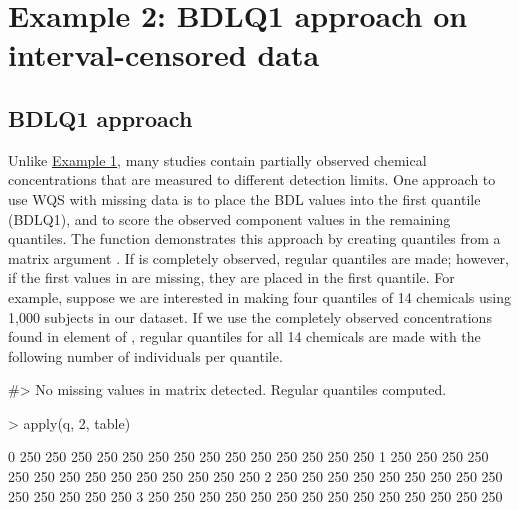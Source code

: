 \hypertarget{example-2-bdlq1-approach-on-interval-censored-data}{%
\section{Example 2: BDLQ1 approach on interval-censored
data}\label{example-2-bdlq1-approach-on-interval-censored-data}}

\hypertarget{bdlq1-approach}{%
\subsection{BDLQ1 approach}\label{bdlq1-approach}}

Unlike \protect\hyperlink{Example-1}{Example 1}, many studies contain
partially observed chemical concentrations that are measured to
different detection limits. One approach to use WQS with missing data is
to place the BDL values into the first quantile (BDLQ1), and to score
the observed component values in the remaining quantiles. The
 function demonstrates this approach by
creating  quantiles from a matrix argument .
If  is completely observed, regular quantiles are made; however,
if the first values in  are missing, they are placed in the
first quantile. For example, suppose we are interested in making four
quantiles of 14 chemicals using 1,000 subjects in our dataset. If we use
the completely observed concentrations found in  element of
, regular quantiles for all 14 chemicals are made with
the following number of individuals per quantile.

\begin{Schunk}
\begin{Soutput}
#> No missing values in matrix detected. Regular quantiles computed.
\end{Soutput}
\begin{Sinput}
> apply(q, 2, table)
\end{Sinput}
\begin{Soutput}
  [,1] [,2] [,3] [,4] [,5] [,6] [,7] [,8] [,9] [,10] [,11] [,12] [,13] [,14]
0  250  250  250  250  250  250  250  250  250   250   250   250   250   250
1  250  250  250  250  250  250  250  250  250   250   250   250   250   250
2  250  250  250  250  250  250  250  250  250   250   250   250   250   250
3  250  250  250  250  250  250  250  250  250   250   250   250   250   250
\end{Soutput}
\end{Schunk}

